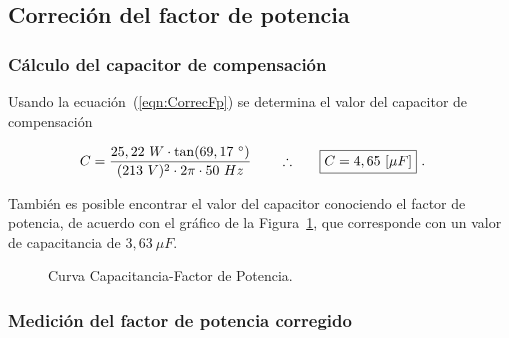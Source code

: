   \subsection{Correción del factor de potencia}
    \subsubsection{Cálculo del capacitor de compensación}
      
       Usando la ecuación~(\ref{eqn:CorrecFp}) se determina el valor del capacitor de compensación

      \begin{align*}
        C = \frac{25,22~W \cdot \tan(69,17~^{\circ} )}{(213~V)^2 \cdot 2  \pi \cdot 50~Hz }  \hspace{20pt} \therefore \hspace{20pt} \Aboxed{C = 4,65~[\mu F]}~.
      \end{align*}

        También es posible encontrar el valor del capacitor conociendo el factor de potencia, de acuerdo
        con el gráfico de la Figura~\ref{fig: Curva Cap_FDP}, que corresponde con un valor de capacitancia de $3,63~\mu F$. 

        \begin{figure}[H]
          \centering
            \caption{Curva Capacitancia-Factor de Potencia.}
            \label{fig: Curva Cap_FDP}
        \end{figure}

        

    \subsubsection{Medición del factor de potencia corregido}\label{subsubsec:Medicion del factor de potencia corregido}

